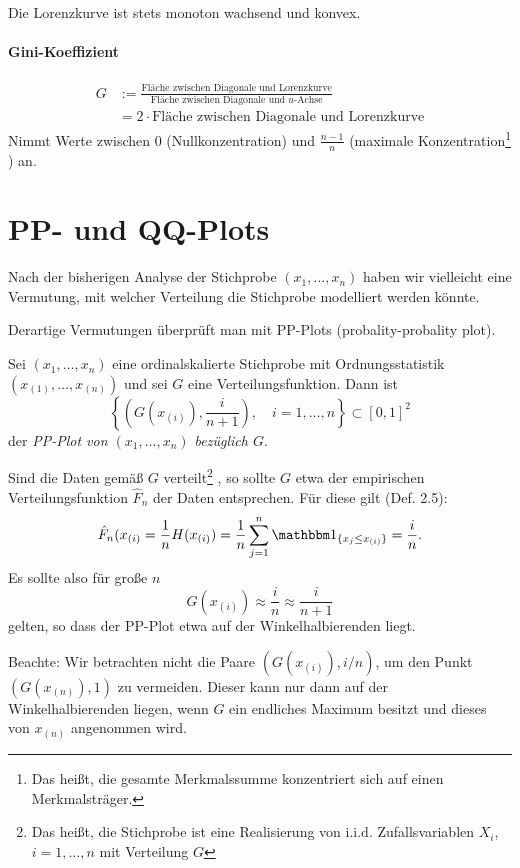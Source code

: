 Die Lorenzkurve ist stets monoton wachsend und konvex.

\paragraph{Gini-Koeffizient}
\[ \begin{aligned}
    G &:= \frac{\text{Fläche zwischen Diagonale und Lorenzkurve}}
    {\text{Fläche zwischen Diagonale und $u$-Achse}} \\
    &= 2 \cdot \text{Fläche zwischen Diagonale und Lorenzkurve}
  \end{aligned} \]
Nimmt Werte zwischen 0 (Nullkonzentration) und $\frac{n-1}{n}$ (maximale
Konzentration\footnote{%
  Das heißt, die gesamte Merkmalssumme konzentriert sich auf einen
  Merkmalsträger.}%
) an.

\section{PP- und QQ-Plots}
Nach der bisherigen Analyse der Stichprobe $(x_1, \ldots, x_n)$ haben wir
vielleicht eine Vermutung, mit welcher Verteilung die Stichprobe modelliert
werden könnte.

Derartige Vermutungen überprüft man mit PP-Plots (probality-probality plot).
\begin{defn} %
  Sei $(x_1, \ldots, x_n)$ eine ordinalskalierte Stichprobe mit
  Ordnungsstatistik $(x_{(1)}, \ldots, x_{(n)})$ und sei $G$ eine
  Verteilungsfunktion. Dann ist
  \[ \left\{ \left( G(x_{(i)}), \frac{i}{n+1} \right), \quad i = 1, \ldots, n
    \right\} \subset [0,1]^2 \]
  der \emph{PP-Plot von $(x_1, \ldots, x_n)$ bezüglich $G$}.
\end{defn}

Sind die Daten gemäß $G$ verteilt\footnote{%
  Das heißt, die Stichprobe ist eine Realisierung von i.i.d. Zufallsvariablen
  $X_i$, $i = 1, \ldots, n$ mit Verteilung $G$}%
, so sollte $G$ etwa der empirischen Verteilungsfunktion $\hat{F}_n$ der Daten
entsprechen. Für diese gilt (Def. 2.5):
\[ \hat{F}_n(x_{(i)} = \rez{n} H( x_{(i)} ) = \rez{n} \sum_{j=1}^n
  \ind_{\{ x_j \le x_{(i)} \}} = \frac{i}{n}. \]
Es sollte also für große $n$
\[ G(x_{(i)}) \approx \frac{i}{n} \approx \frac{i}{n+1} \]
gelten, so dass der PP-Plot etwa auf der Winkelhalbierenden liegt.

Beachte: Wir betrachten nicht die Paare $(G(x_{(i)}), i/n)$, um den Punkt
$(G(x_{(n)}), 1)$ zu vermeiden. Dieser kann nur dann auf der Winkelhalbierenden
liegen, wenn $G$ ein endliches Maximum besitzt und dieses von $x_{(n)}$
angenommen wird.

